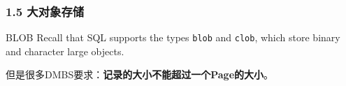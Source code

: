 \documentclass[aspectratio=169, 14pt]{beamer}
\begin{document}
\begin{frame}[fragile]
	\frametitle{1.5 大对象存储}

	\begin{block}{BLOB}
		Recall that SQL supports the types \texttt{blob} and \texttt{clob}, which store binary and character large objects.
	\end{block}

	但是很多DMBS要求：\textbf{记录的大小不能超过一个Page的大小}。

\end{frame}

%
%
\end{document}
